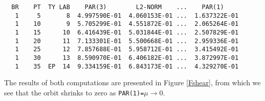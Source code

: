 \documentclass[12pt]{report}
\begin{document}
%
\begin{verbatim}
  BR    PT  TY LAB    PAR(3)        L2-NORM    ...    PAR(1)     
   1     5       8  4.997590E-01  4.060153E-01 ...  1.637322E-01
   1    10       9  5.705299E-01  4.551872E-01 ...  2.065264E-01
   1    15      10  6.416439E-01  5.031844E-01 ...  2.507829E-01
   1    20      11  7.133301E-01  5.500668E-01 ...  2.959336E-01
   1    25      12  7.857688E-01  5.958712E-01 ...  3.415492E-01
   1    30      13  8.590970E-01  6.406182E-01 ...  3.872997E-01
   1    35  EP  14  9.334159E-01  6.843173E-01 ...  4.329270E-01
\end{verbatim}
The results of both computations are presented in Figure \ref{Fshear}, 
from which we see that the orbit shrinks to zero as
{\tt PAR(1)=}$\mu \to 0$.

\newpage   
\end{document}
